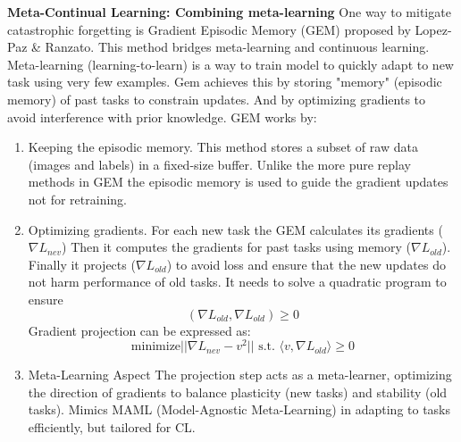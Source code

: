\documentclass{IEEEcsmag}
\begin{document}
    \textbf{Meta-Continual Learning: Combining meta-learning} 
    One way to mitigate catastrophic forgetting is Gradient Episodic Memory (GEM) proposed by Lopez-Paz \& Ranzato\cite{cite-30}.
    This method bridges meta-learning and continuous learning.
    Meta-learning (learning-to-learn) is a way to train model to quickly adapt to new task using very few examples.
    Gem achieves this by storing "memory" (episodic memory) of past tasks to constrain updates.
    And by optimizing gradients to avoid interference with prior knowledge.
    GEM works by:
    \begin{enumerate}
        \item Keeping the episodic memory.
        This method stores a subset of raw data (images and labels) in a fixed-size buffer.
        Unlike the more pure replay methods in GEM the episodic memory is used to guide the gradient updates not for retraining.
        \item Optimizing gradients.
        For each new task the GEM calculates its gradients ($\nabla L_{nev}$)
        Then it computes the gradients for past tasks using memory ($\nabla L_{old}$).
        Finally it projects ($\nabla L_{old}$) to avoid loss and ensure that the new updates do not harm performance of old tasks.
        It needs to solve a quadratic program to ensure 
        \[
           ( \nabla L_{old},\nabla L_{old} ) \geq 0
        \] 
        Gradient projection can be expressed as:
        \[
            \text{minimize}|| \nabla L_{nev} - v^2 ||\text{ s.t. } \langle v,\nabla L_{old} \rangle \geq 0
        \]
        \item Meta-Learning Aspect
        The projection step acts as a meta-learner, optimizing the direction of gradients to balance plasticity (new tasks) and stability (old tasks).
        Mimics MAML (Model-Agnostic Meta-Learning) in adapting to tasks efficiently, but tailored for CL.
    \end{enumerate}
\end{document}
